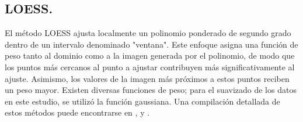 \subsection{LOESS.}

El método LOESS ajusta localmente un polinomio ponderado de segundo grado dentro de un intervalo denominado "ventana". Este enfoque asigna una función de peso tanto al dominio como a la imagen generada por el polinomio, de modo que los puntos más cercanos al punto a ajustar contribuyen más significativamente al ajuste. Asimismo, los valores de la imagen más próximos a estos puntos reciben un peso mayor. Existen diversas funciones de peso; para el suavizado de los datos en este estudio, se utilizó la función gaussiana. Una compilación detallada de estos métodos puede encontrarse en \cite{kelmansky}, \cite{nist} y \cite{cleveland}.